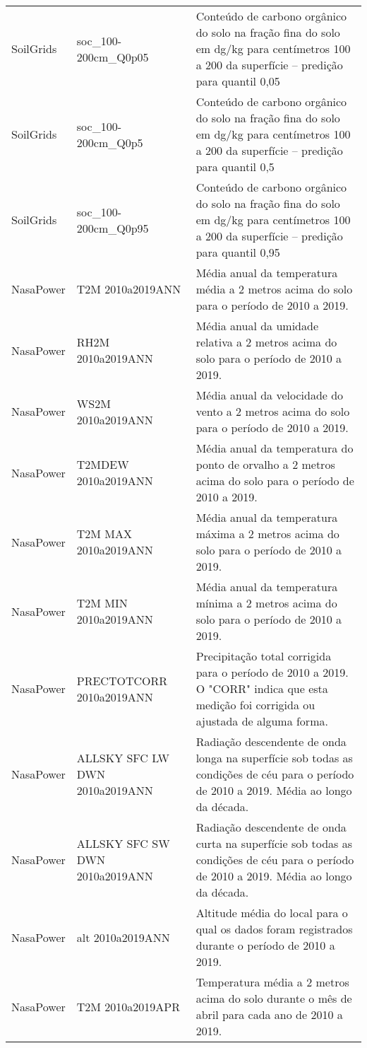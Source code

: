 \begin{longtable}{@{} p{4cm} p{4cm} p{8cm} @{}}
	SoilGrids &
	soc\_100-200cm\_Q0p05 &
	Conteúdo de carbono orgânico do solo na fração fina do solo em dg/kg para centímetros 100 a 200 da superfície – predição para quantil 0,05 \\
	SoilGrids &
	soc\_100-200cm\_Q0p5 &
	Conteúdo de carbono orgânico do solo na fração fina do solo em dg/kg para centímetros 100 a 200 da superfície – predição para quantil 0,5 \\
	SoilGrids &
	soc\_100-200cm\_Q0p95 &
	Conteúdo de carbono orgânico do solo na fração fina do solo em dg/kg para centímetros 100 a 200 da superfície – predição para quantil 0,95 \\
	NasaPower &
	T2M 2010a2019ANN &
	Média anual da temperatura média a 2 metros acima do solo para o período de 2010 a 2019. \\
	NasaPower &
	RH2M 2010a2019ANN &
	Média anual da umidade relativa a 2 metros acima do solo para o período de 2010 a 2019. \\
	NasaPower &
	WS2M 2010a2019ANN &
	Média anual da velocidade do vento a 2 metros acima do solo para o período de 2010 a 2019. \\
	NasaPower &
	T2MDEW 2010a2019ANN &
	Média anual da temperatura do ponto de orvalho a 2 metros acima do solo para o período de 2010 a 2019. \\
	NasaPower &
	T2M MAX 2010a2019ANN &
	Média anual da temperatura máxima a 2 metros acima do solo para o período de 2010 a 2019. \\
	NasaPower &
	T2M MIN 2010a2019ANN &
	Média anual da temperatura mínima a 2 metros acima do solo para o período de 2010 a 2019. \\
	NasaPower &
	PRECTOTCORR 2010a2019ANN &
	Precipitação total corrigida para o período de 2010 a 2019. O "CORR" indica que esta medição foi corrigida ou ajustada de alguma forma. \\
	NasaPower &
	ALLSKY SFC LW DWN 2010a2019ANN &
	Radiação descendente de onda longa na superfície sob todas as condições de céu para o período de 2010 a 2019. Média ao longo da década. \\
	NasaPower &
	ALLSKY SFC SW DWN 2010a2019ANN &
	Radiação descendente de onda curta na superfície sob todas as condições de céu para o período de 2010 a 2019. Média ao longo da década. \\
	NasaPower &
	alt 2010a2019ANN &
	Altitude média do local para o qual os dados foram registrados durante o período de 2010 a 2019. \\
	NasaPower &
	T2M 2010a2019APR &
	Temperatura média a 2 metros acima do solo durante o mês de abril para cada ano de 2010 a 2019. \\

\end{longtable}
